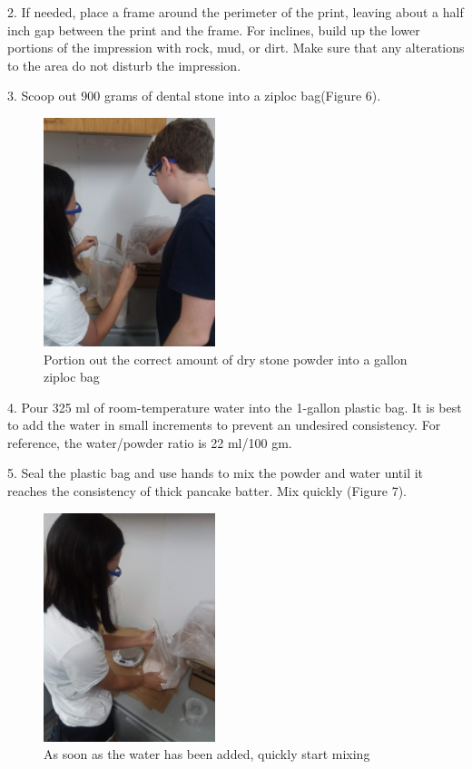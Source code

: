 2. If needed, place a frame around the perimeter of the print, leaving about a half inch gap between the print and the frame. For inclines, build up the lower portions of the impression with rock, mud, or dirt. Make sure that any alterations to the area do not disturb the impression. 

3. Scoop out 900 grams of dental stone into a ziploc bag(Figure 6).

\begin{figure}[!htp]
\centering
\includegraphics[width=5cm]{Cast_Scoop}
\caption{Portion out the correct amount of dry stone powder into a gallon ziploc bag}
\label{Image 6}
\end{figure}

\newpage

4. Pour 325 ml of room-temperature water into the 1-gallon plastic bag. It is best to add the water in small increments to prevent an undesired consistency. For reference, the water/powder ratio is 22 ml/100 gm. 

5. Seal the plastic bag and use hands to mix the powder and water until it reaches the consistency of thick pancake batter. Mix quickly (Figure 7).

\begin{figure}[!htp]
\centering
\includegraphics[width=5cm]{Cast_Mix}
\caption{As soon as the water has been added, quickly start mixing}
\label{Image 7}
\end{figure}

